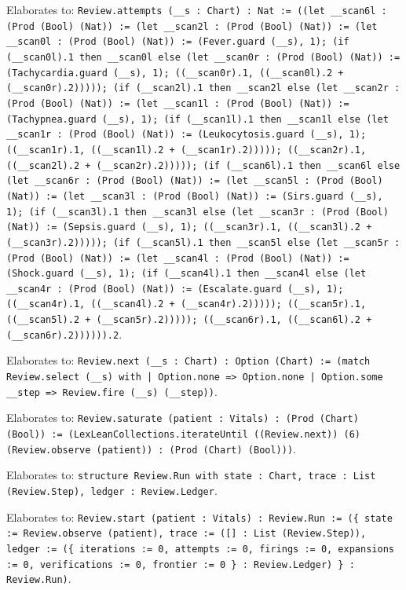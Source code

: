 \documentclass[11pt]{article}
\begin{document}
\noindent Elaborates to: \texttt{Review.attempts (\_\_s : Chart) : Nat := ((let \_\_scan6l : (Prod (Bool) (Nat)) := (let \_\_scan2l : (Prod (Bool) (Nat)) := (let \_\_scan0l : (Prod (Bool) (Nat)) := (Fever.guard (\_\_s), 1); (if (\_\_scan0l).1 then \_\_scan0l else (let \_\_scan0r : (Prod (Bool) (Nat)) := (Tachycardia.guard (\_\_s), 1); ((\_\_scan0r).1, ((\_\_scan0l).2 + (\_\_scan0r).2))))); (if (\_\_scan2l).1 then \_\_scan2l else (let \_\_scan2r : (Prod (Bool) (Nat)) := (let \_\_scan1l : (Prod (Bool) (Nat)) := (Tachypnea.guard (\_\_s), 1); (if (\_\_scan1l).1 then \_\_scan1l else (let \_\_scan1r : (Prod (Bool) (Nat)) := (Leukocytosis.guard (\_\_s), 1); ((\_\_scan1r).1, ((\_\_scan1l).2 + (\_\_scan1r).2))))); ((\_\_scan2r).1, ((\_\_scan2l).2 + (\_\_scan2r).2))))); (if (\_\_scan6l).1 then \_\_scan6l else (let \_\_scan6r : (Prod (Bool) (Nat)) := (let \_\_scan5l : (Prod (Bool) (Nat)) := (let \_\_scan3l : (Prod (Bool) (Nat)) := (Sirs.guard (\_\_s), 1); (if (\_\_scan3l).1 then \_\_scan3l else (let \_\_scan3r : (Prod (Bool) (Nat)) := (Sepsis.guard (\_\_s), 1); ((\_\_scan3r).1, ((\_\_scan3l).2 + (\_\_scan3r).2))))); (if (\_\_scan5l).1 then \_\_scan5l else (let \_\_scan5r : (Prod (Bool) (Nat)) := (let \_\_scan4l : (Prod (Bool) (Nat)) := (Shock.guard (\_\_s), 1); (if (\_\_scan4l).1 then \_\_scan4l else (let \_\_scan4r : (Prod (Bool) (Nat)) := (Escalate.guard (\_\_s), 1); ((\_\_scan4r).1, ((\_\_scan4l).2 + (\_\_scan4r).2))))); ((\_\_scan5r).1, ((\_\_scan5l).2 + (\_\_scan5r).2))))); ((\_\_scan6r).1, ((\_\_scan6l).2 + (\_\_scan6r).2)))))).2}.\par
\noindent Elaborates to: \texttt{Review.next (\_\_s : Chart) : Option (Chart) := (match Review.select (\_\_s) with | Option.none => Option.none | Option.some \_\_step => Review.fire (\_\_s) (\_\_step))}.\par
\noindent Elaborates to: \texttt{Review.saturate (patient : Vitals) : (Prod (Chart) (Bool)) := (LexLeanCollections.iterateUntil ((Review.next)) (6) (Review.observe (patient)) : (Prod (Chart) (Bool)))}.\par
\noindent Elaborates to: \texttt{structure Review.Run with state : Chart, trace : List (Review.Step), ledger : Review.Ledger}.\par
\noindent Elaborates to: \texttt{Review.start (patient : Vitals) : Review.Run := (\{ state := Review.observe (patient), trace := ([] : List (Review.Step)), ledger := (\{ iterations := 0, attempts := 0, firings := 0, expansions := 0, verifications := 0, frontier := 0 \} : Review.Ledger) \} : Review.Run)}.\par
\end{document}
